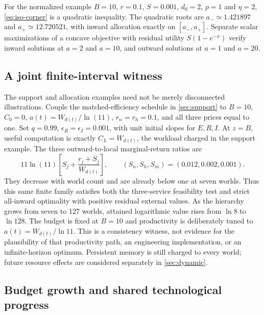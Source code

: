 For the normalized example $B=10$, $r=0.1$, $S=0.001$, $d_0=2$,
$p=1$ and $\eta=2$, \eqref{eq:iso-corner} is a quadratic inequality.
The quadratic roots are $a_-\simeq1.421897$ and $a_+\simeq12.720521$, with inward
allocation exactly on $[a_-,a_+]$. Separate scalar maximizations of a
concave objective with residual utility $S(1-e^{-x})$ verify inward
solutions at $a=2$ and $a=10$, and outward solutions at $a=1$ and $a=20$.

\subsection{A joint finite-interval witness}

The support and allocation examples need not be merely disconnected illustrations. Couple the matched-efficiency schedule in \cref{sec:support} to $B=10$, $C_0=0$, $a(t)=W_{d(t)}/\ln(11)$, $r_n=r_h=0.1$, and all three prices equal to one. Set $q=0.99$, $\epsilon_R=\epsilon_I=0.001$, with unit initial slopes for $E,R,I$. At $z=B$, useful computation is exactly $C_L=W_{d(t)}$, the workload charged in the support example. The three outward-to-local marginal-return ratios are
\begin{equation}
 11\ln(11)\left[S_j+\frac{r_j+S_j}{W_{d(t)}}\right],
 \qquad(S_n,S_h,S_m)=(0.012,0.002,0.001).
 \label{eq:joint-witness}
\end{equation}
They decrease with world count and are already below one at seven worlds. Thus this same finite family satisfies both the three-service feasibility test and strict all-inward optimality with positive residual external values. As the hierarchy grows from seven to 127 worlds, attained logarithmic value rises from $\ln8$ to $\ln128$. The budget is fixed at $B=10$ and productivity is deliberately tuned to $a(t)=W_{d(t)}/\ln 11$. This is a consistency witness, not evidence for the plausibility of that productivity path, an engineering implementation, or an infinite-horizon optimum. Persistent memory is still charged to every world; future resource effects are considered separately in \cref{sec:dynamic}.

\subsection{Budget growth and shared technological progress}

